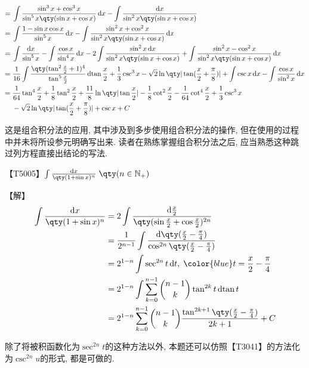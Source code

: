 \documentclass{ctexbook}
\newcommand*{\dif}{\mathop{}\!\mathrm{d}}
\begin{document}
{\begin{align*}
={}&\int\frac{\sin^{3}{x}+\cos^{3}{x}}{\sin^{5}{x}\qty(\sin{x}+\cos{x})}\dif{x}-\int\frac{\dif{x}}{\sin^{2}{x}\qty(\sin{x}+\cos{x})}\\
={}&\int\frac{1-\sin{x}\cos{x}}{\sin^{5}{x}}\dif{x}-\int\frac{\sin^{2}{x}+\cos^{2}{x}}{\sin^{2}{x}\qty(\sin{x}+\cos{x})}\dif{x}\\
={}&\int\frac{\dif{x}}{\sin^{5}{x}}-\int\frac{\cos{x}}{\sin^{4}{x}}\dif{x}-2\int\frac{\sin^{2}{x}\dif{x}}{\sin^{2}{x}\qty(\sin{x}+\cos{x})}+\int\frac{\sin^{2}{x}-\cos^{2}{x}}{\sin^{2}{x}\qty(\sin{x}+\cos{x})}\dif{x}\\
={}&\frac{1}{16}\int\frac{\qty(\tan^{2}{\frac{x}{2}}+1)^{4}}{\tan^{5}{\frac{x}{2}}}\dif{\tan{\frac{x}{2}}}+\frac{1}{3}\csc^{3}{x}-\sqrt{2}\ln\qty|\tan(\frac{x}{2}+\frac{\pi}{8})|+\int\csc{x}\dif{x}-\int\frac{\cos{x}}{\sin^{2}{x}}\dif{x}\\
={}&\frac{1}{64}\tan^{4}{\frac{x}{2}}+\frac{1}{8}\tan^{2}{\frac{x}{2}}+\frac{11}{8}\ln\qty|\tan{\frac{x}{2}}|-\frac{1}{8}\cot^{2}{\frac{x}{2}}-\frac{1}{64}\cot^{4}{\frac{x}{2}}+\frac{1}{3}\csc^{3}{x}\\
{}&-\sqrt{2}\ln\qty|\tan(\frac{x}{2}+\frac{\pi}{8})|+\csc{x}+C
\end{align*}\par
{\kaishu 这是组合积分法的应用, 其中涉及到多步使用组合积分法的操作, 但在使用的过程中并未将所设参元明确写出来. 读者在熟练掌握组合积分法之后, 应当熟悉这种跳过列方程直接出结论的写法. \par}
【T5005】$\int\frac{\dif{x}}{\qty(1+\sin{x})^{n}}\;\qty(n\in\mathbb{N_{+}})$\par
【解】
\begin{align*}
\int\frac{\dif{x}}{\qty(1+\sin{x})^{n}}={}&2\int\frac{\dif{\frac{x}{2}}}{\qty(\sin{\frac{x}{2}}+\cos{\frac{x}{2}})^{2n}}\\
={}&\frac{1}{2^{n-1}}\int\frac{\dif{\qty(\frac{x}{2}-\frac{\pi}{4})}}{\cos^{2n}\qty(\frac{x}{2}-\frac{\pi}{4})}\\
={}&2^{1-n}\int\sec^{2n}{t}\dif{t},\;{\color{blue}t=\frac{x}{2}-\frac{\pi}{4}}\\
={}&2^{1-n}\int\sum_{k=0}^{n-1}\binom{n-1}{k}\tan^{2k}{t}\dif{\tan{t}}\\
={}&2^{1-n}\sum_{k=0}^{n-1}\binom{n-1}{k}\frac{\tan^{2k+1}\qty(\frac{x}{2}-\frac{\pi}{4})}{2k+1}+C
\end{align*}\par
{\kaishu 除了将被积函数化为$\sec^{2n}{t}$的这种方法以外, 本题还可以仿照{\color{red}【T3041】}的方法化为$\csc^{2n}{u}$的形式, 都是可做的. \par}
}
\end{document}
